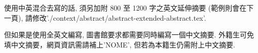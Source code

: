 \StartAbstract

使用中英混合去寫的話, 須另加附 800 至 1200 字之英文延伸摘要 (範例則會在下一頁), 請修改'./context/abstract/abstract-extended-abstract.tex'.

但如果是使用全英文編寫, 圖書館要求都需要同時編寫一個中文摘要. 外籍生可免填中文摘要，網頁資訊需請補上'NOME', 但若為本籍生仍需附上中文摘要.

\EndChiAbstract
